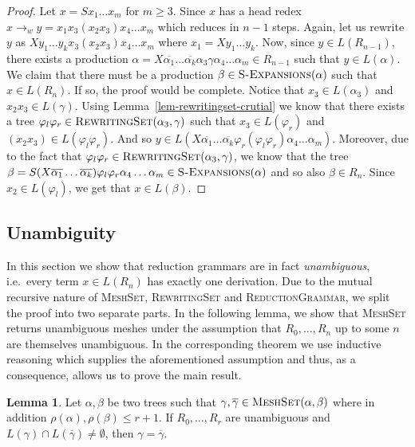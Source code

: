 \documentclass[11pt,a4paper]{amsart}
\theoremstyle{definition}
\newtheorem{lemma}[theorem]{Lemma}
\newcommand{\SExpansions}[1]{\textsc{S-Expansions}(#1)}
\newcommand{\RewritingSet}[2]{\textsc{RewritingSet}(#1,#2)}
\newcommand{\MeshSet}[2]{\textsc{MeshSet}(#1,#2)}
\newcommand{\rank}[1]{\rho(#1)}
\begin{document}
\begin{proof}
    Let $x = S x_1 \ldots x_m$ for $m \geq 3$. Since $x$ has a head redex $x \to_w y = x_1 x_3 (x_2 x_3) x_4 \ldots x_m$ which reduces in $n-1$
    steps. Again, let us rewrite $y$ as $X y_1 \ldots
    y_k x_3 (x_2 x_3) x_4 \ldots x_m$ where $x_1 = X y_1 \ldots y_k$. Now, since $y \in L(R_{n-1})$, there exists a production $\alpha = X \overline{\alpha_1} 
    \ldots \overline{\alpha_k} \alpha_3 \gamma
    \alpha_4 \ldots \alpha_m \in R_{n-1}$ such that $y \in L(\alpha)$. We claim
    that there must be a production $\beta \in \SExpansions{\alpha}$ such that
    $x \in L(R_n)$. If so, the proof would be complete. Notice that $x_3 \in
    L(\alpha_3)$ and $x_2 x_3 \in L(\gamma)$. Using Lemma~\ref{lem-rewritingset-crutial}
    we know that there exists a tree $\varphi_l \varphi_r \in
    \RewritingSet{\alpha_3}{\gamma}$ such that $x_3 \in L(\varphi_r)$ and $(x_2
    x_3) \in L(\varphi_l \varphi_r)$. And so $y \in L(X \overline{\alpha_1} 
    \ldots \overline{\alpha_k} \varphi_r (\varphi_l \varphi_r)
    \alpha_4 \ldots \alpha_m)$. Moreover, due to the fact that $\varphi_l \varphi_r \in
    \RewritingSet{\alpha_3}{\gamma}$, we know that the tree $\beta = S (X \overline{\alpha_1} 
    \ldots \overline{\alpha_k}) \varphi_l \varphi_r
    \alpha_4 \ldots \alpha_m \in \SExpansions{\alpha}$ and so also $\beta \in
    R_n$. Since $x_2 \in L(\varphi_l)$, we get that $x \in L(\beta)$.
\end{proof}

\subsection{Unambiguity}\label{sec:unambiguity}

In this section we show that reduction grammars are in fact \emph{unambiguous}, i.e.~every term $x \in L(R_n)$ has exactly one derivation. Due to the mutual recursive nature of \textsc{MeshSet}, \textsc{RewritingSet} and \textsc{ReductionGrammar}, we split the proof into two separate parts. In the following lemma, we show that \textsc{MeshSet} returns unambiguous meshes under the assumption that $R_0,\ldots,R_n$ up to some $n$ are  themselves unambiguous. In the corresponding theorem we use inductive reasoning which supplies the aforementioned assumption and thus, as a consequence, allows us to prove the main result.

\begin{lemma}\label{lem-meshset-disjoint}
        Let $\alpha, \beta$ be two trees such that $\gamma,\overline{\gamma} \in
        \MeshSet{\alpha}{\beta}$ where in addition $\rank{\alpha},\rank{\beta}
        \leq r + 1$.  If $R_0,\ldots,R_r$ are unambiguous and $L(\gamma) \cap
        L(\overline{\gamma}) \neq \emptyset$, then $\gamma = \overline{\gamma}$.
\end{lemma}
\end{document}
